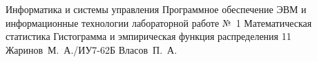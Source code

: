 \documentclass[a4paper,14pt, unknownkeysallowed]{extreport}
\begin{document}
\makereporttitle
{Информатика и системы управления} %
{Программное обеспечение ЭВМ и информационные технологии} %
{лабораторной работе №~1} %
{Математическая статистика} %
{Гистограмма и эмпирическая функция распределения} %
{11} %
{Жаринов~М.~А./ИУ7-62Б} %
{Власов~П.~А.} %
\setcounter{page}{2}

\end{document}
